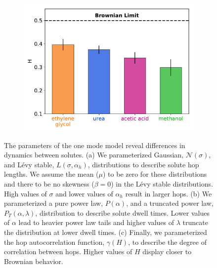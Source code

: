 \documentclass[aps,pre,preprint,groupedaddress,longbibliography]{revtex4-2}
\begin{document}
\begin{figure}
\begin{subfigure}{0.325\textwidth}
  \includegraphics[width=\textwidth]{hurst_barchart.pdf}
  \caption{}\label{fig:hurst_barchart}
  \end{subfigure}
  \caption{The parameters of the one mode model reveal differences in dynamics between
  solutes. (a) We parameterized Gaussian, $\mathcal{N}(\sigma)$, and L\'evy stable, 
  $L(\sigma, \alpha_h)$, distributions to describe solute hop lengths. We assume the 
  mean ($\mu$) to be zero for these distributions and there to be no skewness ($\beta = 0$)
  in the L\'evy stable distributions. High values of $\sigma$ and lower values of $\alpha_h$
  result in larger hops. (b) We parameterized a pure power law, $P(\alpha)$, and a 
  truncated power law, $P_T(\alpha, \lambda)$, distribution to describe solute dwell
  times. Lower values of $\alpha$ lead to heavier power law tails and higher values of 
  $\lambda$ truncate the distribution at lower dwell times. (c) Finally, we parameterized the
  hop autocorrelation function, $\gamma(H)$, to describe the degree of correlation between
  hops. Higher values of $H$ display closer to Brownian behavior.}\label{fig:1mode_parameters}
  \end{figure}
  
\end{document}

